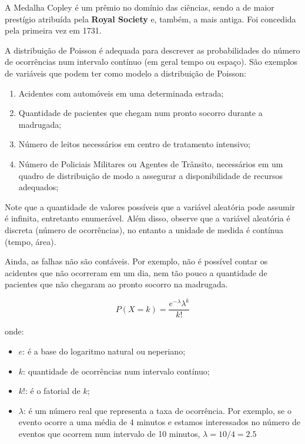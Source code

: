 A Medalha Copley é um prêmio no domínio das ciências, sendo
a de maior prestígio atribuída pela \textbf{Royal Society} e, também, a mais antiga. Foi concedida pela primeira vez em 1731.\vskip0.3cm


  
\inic A distribuição de Poisson é adequada para descrever as probabilidades do número de ocorrências num intervalo contínuo (em geral tempo ou espaço). São exemplos de variáveis que podem ter como modelo a distribuição de Poisson:

\begin{enumerate}
    \item Acidentes com automóveis em uma determinada estrada;
    \item Quantidade de pacientes que chegam num pronto socorro durante a madrugada;
    \item  Número de leitos necessários em centro de tratamento intensivo;
    \item  Número de Policiais Militares ou Agentes de Trânsito, necessários em um quadro de distribuição de modo a assegurar a disponibilidade de recursos adequados;
\end{enumerate}



\inic Note que a quantidade de valores possíveis que a variável aleatória pode assumir é infinita, entretanto enumerável. Além disso, observe que a variável aleatória é discreta (número de ocorrências), no entanto a unidade de medida é contínua (tempo, área).\vskip0.3cm

Ainda, as falhas não são contáveis. Por exemplo, não é possível contar os acidentes que não ocorreram em um dia, nem tão pouco a quantidade de pacientes que não chegaram ao pronto socorro na madrugada.
 
 
\begin{equation}
    P\left(X=k\right)= \frac{e^{-\lambda}\lambda^{k}}{k!}
\end{equation}

onde:

\begin{itemize}
\item $e$: é a base do logaritmo natural ou neperiano;
\item $k$: quantidade de ocorrências num intervalo contínuo;
\item $k!$: é o fatorial de $k$; 
\item $\lambda$: é um número real que representa a taxa de ocorrência. Por exemplo, se o evento ocorre a uma média de 4 minutos e estamos interessados no número de eventos que ocorrem num intervalo de 10 minutos, $\lambda={10}/{4}=2.5$
\end{itemize}

